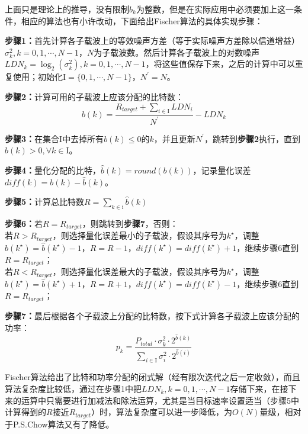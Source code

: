 上面只是理论上的推导，没有限制$b_k$为整数，但是在实际应用中必须要加上这一条件，相应的算法也有小许改动，下面给出Fischer算法的具体实现步骤：
\begin{description}
\item{\bf{步骤1：}}首先计算各子载波上的等效噪声方差（等于实际噪声方差除以信道增益）$\sigma_k^2,k=0,1,\cdots,N-1$，$N$为子载波数。然后计算各子载波上的对数噪声$LDN_k=\log_2(\sigma_k^2),k=0,1,\cdots,N-1$，将这些值保存下来，之后的计算中可以重复使用；初始化$\mathrm{I}=\{0,1,\cdots,N-1\}$，$N^\prime=N$。
\item{\bf{步骤2：}}计算可用的子载波上应该分配的比特数：
\begin{equation}
b(k) = \frac{R_{target}+\sum_{i\in \mathrm{I}}LDN_i}{N^\prime}-LDN_k
\end{equation}
\item{\bf{步骤3：}}在集合$\mathrm{I}$中去掉所有$b(k)\leq 0$的$k$，并且更新$N^\prime$，跳转到\textbf{步骤2}执行，直到$b(k)>0, \forall k\in \mathrm{I}$。
\item{\bf{步骤4：}}量化分配的比特，$\hat{b}(k)=round(b(k))$，记录量化误差$diff(k)=b(k)-\hat{b}(k)$。
\item{\bf{步骤5：}}计算总比特数$R=\sum_{k\in \mathrm{i}}\hat{b}(k)$
\item{\bf{步骤6：}}若$R=R_{target}$，则跳转到\textbf{步骤7}，否则：\\
若$R>R_{target}$，则选择量化误差最小的子载波，假设其序号为$k^\star$，调整$\hat{b}(k^\star)=\hat{b}(k^\star)-1$，$R=R-1$，$diff(k^\star)=diff(k^\star)+1$，继续步骤6直到$R=R_{target}$；\\
若$R<R_{target}$，则选择量化误差最大的子载波，假设其序号为$k^\star$，调整$\hat{b}(k^\star)=\hat{b}(k^\star)+1$，$R=R+1$，$diff(k^\star)=diff(k^\star)-1$，继续步骤6直到$R=R_{target}$；
\item{\bf{步骤7：}}最后根据各个子载波上分配的比特数，按下式计算各子载波上应该分配的功率：
\begin{equation}
p_k = \frac{P_{total}\cdot \sigma_k^2\cdot 2^{\hat{b}(k)}}{\sum_{i\in \mathrm{I}}\sigma_i^2\cdot 2^{\hat{b}(i)}}
\end{equation}
\end{description}

Fischer算法给出了比特和功率分配的闭式解（经有限次迭代之后一定收敛），而且算法复杂度比较低，通过在步骤1中把$LDN_k, k=0,1,\cdots,N-1$存储下来，在接下来的运算中只需要进行加减法和除法运算，尤其是当目标速率设置适当（步骤5中计算得到的$R$接近$R_{target}$）时，算法复杂度可以进一步降低，为$O(N)$量级，相对于P.S.Chow算法又有了降低。

